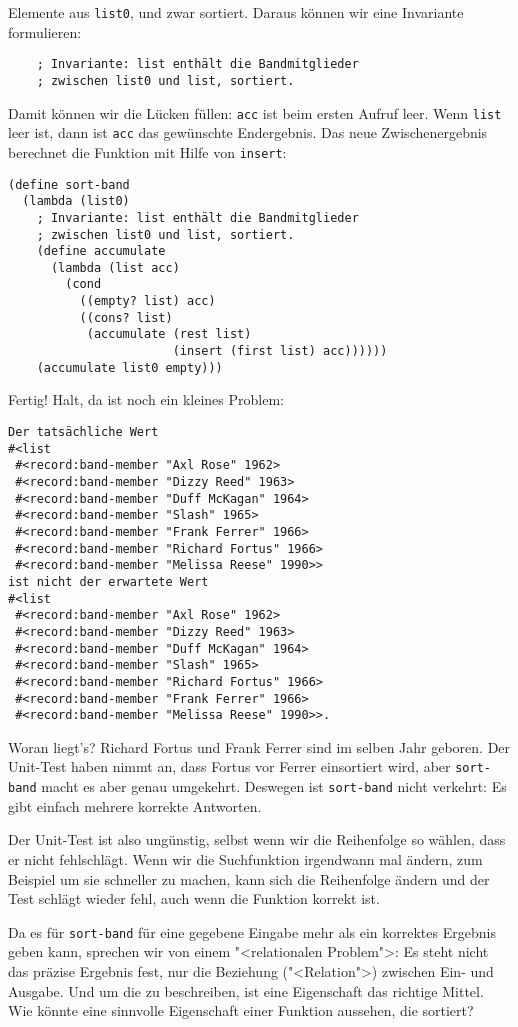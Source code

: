 Elemente aus \lstinline{list0}, und zwar sortiert.  Daraus können wir
eine Invariante formulieren:
%
\begin{lstlisting}
    ; Invariante: list enthält die Bandmitglieder
    ; zwischen list0 und list, sortiert.
\end{lstlisting}
%
Damit können wir die Lücken füllen: \lstinline{acc} ist beim ersten
Aufruf leer.  Wenn \lstinline{list} leer ist, dann ist \lstinline{acc}
das gewünschte Endergebnis.  Das neue Zwischenergebnis berechnet die
Funktion mit Hilfe von \lstinline{insert}:
%
\begin{lstlisting}
(define sort-band
  (lambda (list0)
    ; Invariante: list enthält die Bandmitglieder
    ; zwischen list0 und list, sortiert.
    (define accumulate     
      (lambda (list acc)
        (cond
          ((empty? list) acc)
          ((cons? list)
           (accumulate (rest list)
                       (insert (first list) acc))))))
    (accumulate list0 empty)))
\end{lstlisting}
%
Fertig! Halt, da ist noch ein kleines Problem:
%
\begin{verbatim}
Der tatsächliche Wert 
#<list
 #<record:band-member "Axl Rose" 1962>
 #<record:band-member "Dizzy Reed" 1963>
 #<record:band-member "Duff McKagan" 1964>
 #<record:band-member "Slash" 1965>
 #<record:band-member "Frank Ferrer" 1966>
 #<record:band-member "Richard Fortus" 1966>
 #<record:band-member "Melissa Reese" 1990>>
ist nicht der erwartete Wert 
#<list
 #<record:band-member "Axl Rose" 1962>
 #<record:band-member "Dizzy Reed" 1963>
 #<record:band-member "Duff McKagan" 1964>
 #<record:band-member "Slash" 1965>
 #<record:band-member "Richard Fortus" 1966>
 #<record:band-member "Frank Ferrer" 1966>
 #<record:band-member "Melissa Reese" 1990>>.
\end{verbatim}
%
Woran liegt's?  Richard Fortus und Frank Ferrer sind im selben Jahr
geboren.  Der Unit-Test haben nimmt an, dass Fortus vor Ferrer
einsortiert wird, aber \lstinline{sort-band} macht es aber genau
umgekehrt.  Deswegen ist \lstinline{sort-band} nicht verkehrt: Es gibt
einfach mehrere korrekte Antworten.

Der Unit-Test ist also ungünstig, selbst wenn wir die Reihenfolge so
wählen, dass er nicht fehlschlägt.  Wenn wir die Suchfunktion
irgendwann mal ändern, zum Beispiel um sie schneller zu machen, kann
sich die Reihenfolge ändern und der Test schlägt wieder fehl, auch
wenn die Funktion korrekt ist.

Da es für \lstinline{sort-band} für eine gegebene Eingabe mehr als ein
korrektes Ergebnis geben kann, sprechen wir von einem "<relationalen
Problem">: Es steht nicht das präzise
Ergebnis fest, nur die Beziehung ("<Relation">) zwischen Ein- und
Ausgabe.  Und um die zu beschreiben, ist eine Eigenschaft das richtige
Mittel.  Wie könnte eine sinnvolle Eigenschaft einer Funktion
aussehen, die sortiert?

